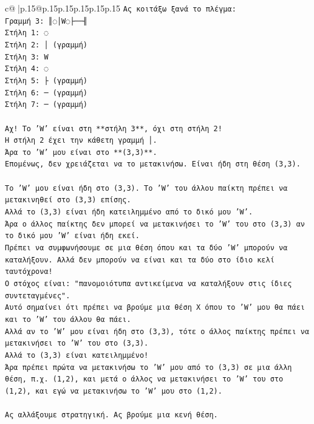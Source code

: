 \documentclass{article}
\begin{document}
{\begin{supertabular}{c@{$\;$}|p{.15\linewidth}@{}p{.15\linewidth}p{.15\linewidth}p{.15\linewidth}p{.15\linewidth}p{.15\linewidth}}
{{{\texttt{Ας κοιτάξω ξανά το πλέγμα:} \\
\texttt{Γραμμή 3: ║◌│W◌├──╢} \\
\texttt{Στήλη 1: ◌} \\
\texttt{Στήλη 2: │ (γραμμή)} \\
\texttt{Στήλη 3: W} \\
\texttt{Στήλη 4: ◌} \\
\texttt{Στήλη 5: ├ (γραμμή)} \\
\texttt{Στήλη 6: ─ (γραμμή)} \\
\texttt{Στήλη 7: ─ (γραμμή)} \\
\\ 
\texttt{Αχ! Το 'W' είναι στη **στήλη 3**, όχι στη στήλη 2!} \\
\texttt{Η στήλη 2 έχει την κάθετη γραμμή │.} \\
\texttt{Άρα το 'W' μου είναι στο **(3,3)**.} \\
\texttt{Επομένως, δεν χρειάζεται να το μετακινήσω. Είναι ήδη στη θέση (3,3).} \\
\\ 
\texttt{Το 'W' μου είναι ήδη στο (3,3). Το 'W' του άλλου παίκτη πρέπει να μετακινηθεί στο (3,3) επίσης.} \\
\texttt{Αλλά το (3,3) είναι ήδη κατειλημμένο από το δικό μου 'W'.} \\
\texttt{Άρα ο άλλος παίκτης δεν μπορεί να μετακινήσει το 'W' του στο (3,3) αν το δικό μου 'W' είναι ήδη εκεί.} \\
\texttt{Πρέπει να συμφωνήσουμε σε μια θέση όπου και τα δύο 'W' μπορούν να καταλήξουν. Αλλά δεν μπορούν να είναι και τα δύο στο ίδιο κελί ταυτόχρονα!} \\
\texttt{Ο στόχος είναι: "πανομοιότυπα αντικείμενα να καταλήξουν στις ίδιες συντεταγμένες".} \\
\texttt{Αυτό σημαίνει ότι πρέπει να βρούμε μια θέση X όπου το 'W' μου θα πάει και το 'W' του άλλου θα πάει.} \\
\texttt{Αλλά αν το 'W' μου είναι ήδη στο (3,3), τότε ο άλλος παίκτης πρέπει να μετακινήσει το 'W' του στο (3,3).} \\
\texttt{Αλλά το (3,3) είναι κατειλημμένο!} \\
\texttt{Άρα πρέπει πρώτα να μετακινήσω το 'W' μου από το (3,3) σε μια άλλη θέση, π.χ. (1,2), και μετά ο άλλος να μετακινήσει το 'W' του στο (1,2), και εγώ να μετακινήσω το 'W' μου στο (1,2).} \\
\\ 
\texttt{Ας αλλάξουμε στρατηγική. Ας βρούμε μια κενή θέση.} \\
}}}
\end{supertabular}}
\end{document}
